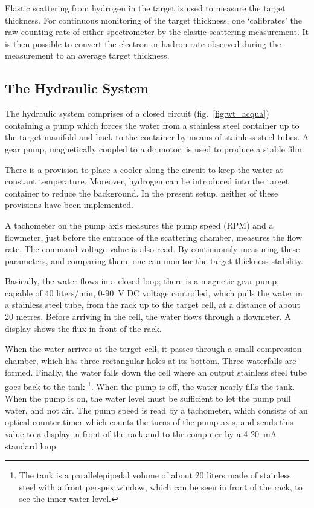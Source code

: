 Elastic scattering from hydrogen in the target is used to measure
the target thickness. For continuous monitoring of the target thickness,
one `calibrates' the raw counting rate of either spectrometer by the
elastic scattering measurement. It is then possible to convert the
electron or hadron rate observed during the measurement to an average
target thickness.


\subsection{The Hydraulic System}

The hydraulic system comprises of a closed circuit (fig.~\ref{fig:wt_acqua})
containing a pump which forces the water from a stainless steel container
up to the target manifold and back to the container by means of stainless
steel tubes. A gear pump, magnetically coupled to a dc motor, is used
to produce a stable film.

There is a provision to place a cooler along the circuit to keep the
water at constant temperature. Moreover, hydrogen can be introduced
into the target container to reduce the background. In the present
setup, neither of these provisions have been implemented.

A tachometer on the pump axis measures the pump speed (RPM) and a
flowmeter, just before the entrance of the scattering chamber, measures
the flow rate. The command voltage value is also read. By continuously
measuring these parameters, and comparing them, one can monitor the
target thickness stability.

Basically, the water flows in a closed loop; there is a magnetic gear
pump, capable of 40 liters/min, 0-90~V DC voltage controlled, which
pulls the water in a stainless steel tube, from the rack up to the
target cell, at a distance of about 20 metres. Before arriving in
the cell, the water flows through a flowmeter. A display shows the
flux in front of the rack.

When the water arrives at the target cell, it passes through a small
compression chamber, which has three rectangular holes at its bottom.
Three waterfalls are formed. Finally, the water falls down the cell
where an output stainless steel tube goes back to the tank%
\footnote{The tank is a parallelepipedal volume of about 20 liters made of stainless
steel with a front perspex window, which can be seen in front of the
rack, to see the inner water level.%
}. When the pump is off, the water nearly fills the tank. When the
pump is on, the water level must be sufficient to let the pump pull
water, and not air. The pump speed is read by a tachometer, which
consists of an optical counter-timer which counts the turns of the
pump axis, and sends this value to a display in front of the rack
and to the computer by a 4-20~mA standard loop.

